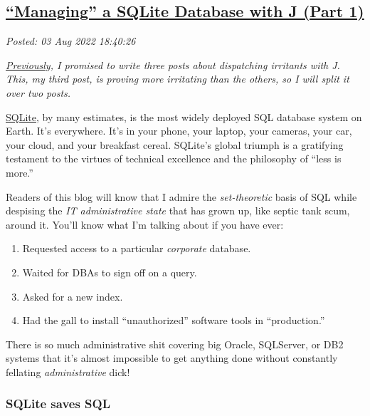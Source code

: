 %

\subsection*{\href{http://analyzethedatanotthedrivel.org/2022/08/03/managing-a-sqlite-database-with-j-part-1/}{``Managing'' a SQLite Database with J (Part 1)}}


\noindent\emph{Posted: 03 Aug 2022 18:40:26}
\vspace{6pt}

\emph{\href{https://analyzethedatanotthedrivel.org/2022/07/17/branding-xmp-sidecar-files-with-j/}{Previously},
I promised to write three posts about dispatching irritants with J.
This, my third post, is proving more irritating than the others, so I
will split it over two posts.}

\bigskip

\href{https://sqlite.org/index.html}{SQLite}, by many estimates, is the
most widely deployed SQL database system on Earth. It's everywhere. It's
in your phone, your laptop, your cameras, your car, your cloud, and your
breakfast cereal. SQLite's global triumph is a gratifying testament to
the virtues of technical excellence and the philosophy of ``less is
more.''

Readers of this blog will know that I admire the \emph{set-theoretic}
basis of SQL while despising the \emph{IT administrative state} that has
grown up, like septic tank scum, around it. You'll know what I'm talking
about if you have ever:

\begin{enumerate}
\tightlist
\item
  Requested access to a particular \emph{corporate} database.
\item
  Waited for DBAs to sign off on a query.
\item
  Asked for a new index.
\item
  Had the gall to install ``unauthorized'' software tools in ``production.''
\end{enumerate}

There is so much administrative shit covering big Oracle, SQLServer, or
DB2 systems that it's almost impossible to get anything done without
constantly fellating \emph{administrative} dick!

\subsubsection*{SQLite saves SQL}%

